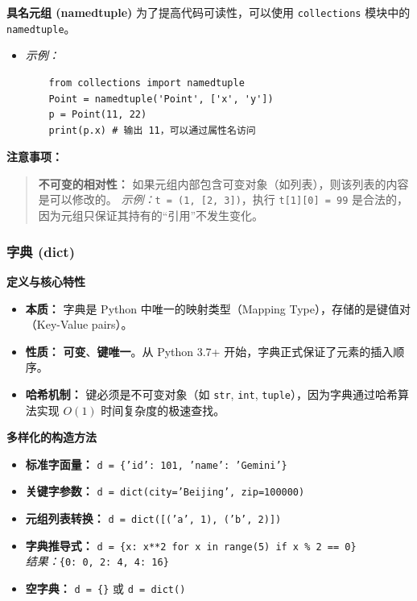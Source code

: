 \documentclass{article}
\begin{document}
\textbf{具名元组 (namedtuple)}
为了提高代码可读性，可以使用 \texttt{collections} 模块中的 \texttt{namedtuple}。
\begin{itemize}
    \item \textit{示例：}
    \begin{verbatim}
    from collections import namedtuple
    Point = namedtuple('Point', ['x', 'y'])
    p = Point(11, 22)
    print(p.x) # 输出 11，可以通过属性名访问
    \end{verbatim}
\end{itemize}

\textbf{注意事项：}
\begin{quote}
\textbf{不可变的相对性：} 如果元组内部包含可变对象（如列表），则该列表的内容是可以修改的。
\textit{示例：}\texttt{t = (1, [2, 3])}，执行 \texttt{t[1][0] = 99} 是合法的，因为元组只保证其持有的“引用”不发生变化。
\end{quote}

\subsubsection{字典 (dict)}

\textbf{定义与核心特性}
\begin{itemize}
    \item \textbf{本质：} 字典是 Python 中唯一的映射类型（Mapping Type），存储的是键值对（Key-Value pairs）。
    \item \textbf{性质：} \textbf{可变}、\textbf{键唯一}。从 Python 3.7+ 开始，字典正式保证了元素的插入顺序。
    \item \textbf{哈希机制：} 键必须是不可变对象（如 \texttt{str}, \texttt{int}, \texttt{tuple}），因为字典通过哈希算法实现 $O(1)$ 时间复杂度的极速查找。
\end{itemize}

\textbf{多样化的构造方法}
\begin{itemize}
    \item \textbf{标准字面量：} \texttt{d = \{'id': 101, 'name': 'Gemini'\}}
    \item \textbf{关键字参数：} \texttt{d = dict(city='Beijing', zip=100000)}
    \item \textbf{元组列表转换：} \texttt{d = dict([('a', 1), ('b', 2)])}
    \item \textbf{字典推导式：} \texttt{d = \{x: x**2 for x in range(5) if x \% 2 == 0\}} \\
    \textit{结果：}\texttt{\{0: 0, 2: 4, 4: 16\}}
    \item \textbf{空字典：} \texttt{d = \{\}} 或 \texttt{d = dict()}
\end{itemize}
\end{document}
